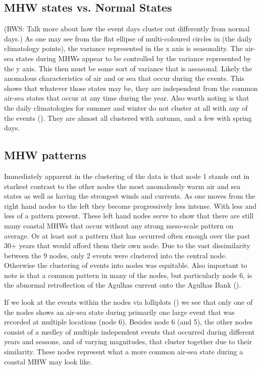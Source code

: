 \documentclass[a4paper,10pt,review]{elsarticle}
\begin{document}
\subsection{MHW states vs. Normal States}
(RWS: Talk more about how the event days cluster out differently from normal days.)
As one may see from the flat ellipse of multi-coloured circles in  (the daily climatology points), the variance represented in the x axis is seasonality. 
The air-sea states during MHWs appear to be controlled by the variance represented by the y axis. This then must be some sort of variance that is aseasonal. Likely the anomalous characteristics of air and or sea that occur during the events. This shows that whatever those states may be, they are independent from the common air-sea states that occur at any time during the year. Also worth noting is that the daily climatologies for summer and winter do not cluster at all with any of the events (). They are almost all clustered with autumn, and a few with spring days.

\subsection{MHW patterns}
Immediately apparent in the clustering of the data is that node 1 stands out in starkest contrast to the other nodes the most anomalously warm air and sea states as well as having the strongest winds and currents. As one moves from the right hand nodes to the left they become progressively less intense. With less and less of a pattern present. These left hand nodes serve to show that there are still many coastal MHWs that occur without any strong meso-scale pattern on average. Or at least not a pattern that has occurred often enough over the past 30+ years that would afford them their own node. Due to the vast dissimilarity between the 9 nodes, only 2 events were clustered into the central node. Otherwise the clustering of events into nodes was equitable. Also important to note is that a common pattern in many of the nodes, but particularly node 6, is the abnormal retroflection of the Agulhas current onto the Agulhas Bank ().

If we look at the events within the nodes via lolliplots () we see that only one of the nodes shows an air-sea state during primarily one large event that was recorded at multiple locations (node 6). Besides node 6 (and 5), the other nodes consist of a medley of multiple independent events that occurred during different years and seasons, and of varying magnitudes, that cluster together due to their similarity. These nodes represent what a more common air-sea state during a coastal MHW may look like.
\end{document}
